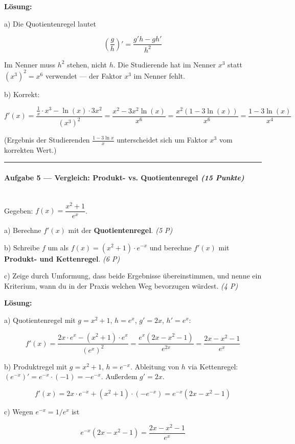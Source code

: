 \documentclass[11pt, a4paper]{article}
\begin{document}
\textbf{Lösung:}


a) Die Quotientenregel lautet

\[
\left(\frac{g}{h}\right)' = \frac{g'h - gh'}{h^2}
\]

Im Nenner muss $h^2$ stehen, nicht $h$. Die Studierende hat im Nenner $x^3$ statt $(x^3)^2 = x^6$ verwendet — der Faktor $x^3$ im Nenner fehlt.


b) Korrekt:

\[
f'(x) = \frac{\frac{1}{x}\cdot x^3 - \ln(x)\cdot 3x^2}{(x^3)^2} = \frac{x^2 - 3x^2\ln(x)}{x^6} = \frac{x^2(1 - 3\ln(x))}{x^6} = \boxed{\frac{1 - 3\ln(x)}{x^4}}
\]


(Ergebnis der Studierenden $\frac{1-3\ln x}{x}$ unterscheidet sich um Faktor $x^3$ vom korrekten Wert.)



\noindent\textcolor{rulegray}{\rule{\linewidth}{0.4pt}}


\paragraph{Aufgabe 5 — Vergleich: Produkt- vs. Quotientenregel \textit{(15 Punkte)}}\mbox{}\\[2pt]

Gegeben: $f(x) = \dfrac{x^2 + 1}{e^x}$.


a) Berechne $f'(x)$ mit der \textbf{Quotientenregel}. \textit{(5 P)}

b) Schreibe $f$ um als $f(x) = (x^2+1)\cdot e^{-x}$ und berechne $f'(x)$ mit \textbf{Produkt- und Kettenregel}. \textit{(6 P)}

c) Zeige durch Umformung, dass beide Ergebnisse übereinstimmen, und nenne ein Kriterium, wann du in der Praxis welchen Weg bevorzugen würdest. \textit{(4 P)}


\textbf{Lösung:}


a) Quotientenregel mit $g = x^2+1$, $h = e^x$, $g' = 2x$, $h' = e^x$:

\[
f'(x) = \frac{2x\cdot e^x - (x^2+1)\cdot e^x}{(e^x)^2} = \frac{e^x(2x - x^2 - 1)}{e^{2x}} = \frac{2x - x^2 - 1}{e^x}
\]


b) Produktregel mit $g = x^2+1$, $h = e^{-x}$. Ableitung von $h$ via Kettenregel: $(e^{-x})' = e^{-x}\cdot(-1) = -e^{-x}$. Außerdem $g' = 2x$.

\[
f'(x) = 2x\cdot e^{-x} + (x^2+1)\cdot(-e^{-x}) = e^{-x}(2x - x^2 - 1)
\]


c) Wegen $e^{-x} = 1/e^x$ ist

\[
e^{-x}(2x - x^2 - 1) = \frac{2x - x^2 - 1}{e^x}
\]
\end{document}
